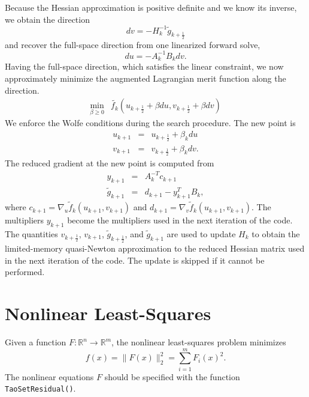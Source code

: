 \documentclass[]{book}
\newcommand{\R}{\mathbb R}
\renewcommand{\Re}{\R}
\begin{document}
Because the Hessian approximation is positive definite and we know its
inverse, we obtain the direction
\[
  dv = -H_k^{-1} \tilde{g}_{k+\frac{1}{2}}
\]
and recover the full-space direction from one linearized forward solve,
\[
  du = -A_k^{-1} B_k dv.
\]
Having the full-space direction, which satisfies the linear constraint, 
we now approximately minimize the augmented Lagrangian merit function 
along the direction.
\[
\begin{array}{lcl}
\displaystyle \min_{\beta \geq 0} & \tilde{f_k}(u_{k+\frac{1}{2}} + \beta du, v_{k+\frac{1}{2}} + \beta dv)
\end{array}
\]
We enforce the Wolfe conditions during the search procedure.  The new point
is
\[
\begin{array}{lcl}
u_{k+1} & = & u_{k+\frac{1}{2}} + \beta_k du \\
v_{k+1} & = & v_{k+\frac{1}{2}} + \beta_k dv.
\end{array}
\]
The reduced gradient at the new point is computed from
\[
\begin{array}{lcl}
y_{k+1} & = & A_k^{-T}c_{k+1} \\
\tilde{g}_{k+1} & = & d_{k+1} - y_{k+1}^T B_k,
\end{array}
\]
where $c_{k+1} = \nabla_u \tilde{f}_k (u_{k+1},v_{k+1})$ and
$d_{k+1} = \nabla_v \tilde{f}_k (u_{k+1},v_{k+1})$.  The
multipliers $y_{k+1}$ become the multipliers used in the
next iteration of the code.  The quantities $v_{k+\frac{1}{2}}$,
$v_{k+1}$, $\tilde{g}_{k+\frac{1}{2}}$, and $\tilde{g}_{k+1}$ are
used to update $H_k$ to obtain the limited-memory quasi-Newton
approximation to the reduced Hessian matrix used in the next
iteration of the code.  The update is skipped if it cannot be
performed.

\section{Nonlinear Least-Squares}
\label{sec:leastsquares}
Given a function $F: \Re^n \to \Re^m$, the nonlinear least-squares 
problem minimizes 
\begin{equation} 
 f(x)= \| F(x) \|_2^2 = \sum_{i=1}^m F_i(x)^2.
 \label{eq:nlsf}
\end{equation}
The nonlinear equations $F$ should be specified with the function
{\tt TaoSetResidual()}. 

\end{document}
